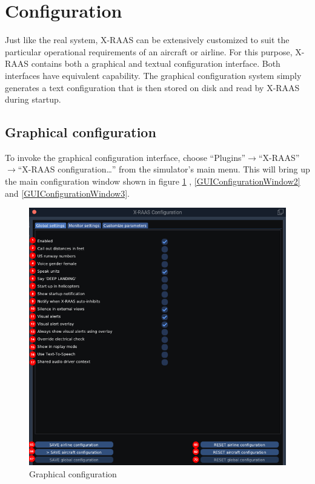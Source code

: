 \documentclass[a4paper,12pt]{article}
\begin{document}
\section{Configuration}
\label{sec:Configuration}

Just like the real system, X-RAAS can be extensively customized to suit
the particular operational requirements of an aircraft or airline. For
this purpose, X-RAAS contains both a graphical and textual configuration
interface. Both interfaces have equivalent capability. The graphical
configuration system simply generates a text configuration that is then
stored on disk and read by X-RAAS during startup.

\subsection{Graphical configuration}
\label{subsec:GUIConfiguration}

To invoke the graphical configuration interface, choose
``Plugins''$\rightarrow$``X-RAAS''$\rightarrow$``X-RAAS configuration\ldots''
from the simulator's main menu. This will bring up the main
configuration window shown in figure \ref{GUIConfigurationWindow1} , \ref{GUIConfigurationWindow2} and \ref{GUIConfigurationWindow3}.

\begin{figure}[H]
\vspace{.5em}
\begin{center}
\includegraphics[width=\textwidth]{../src/config_window_1.png}
\end{center}
\caption{Graphical configuration}
\label{GUIConfigurationWindow1}
\end{figure}
\end{document}
